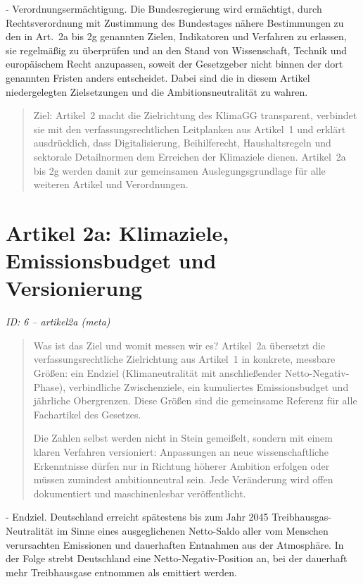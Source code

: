 \documentclass[12pt,a4paper]{scrartcl}
\begin{document}
- Verordnungsermächtigung. Die Bundesregierung wird ermächtigt, durch Rechtsverordnung mit Zustimmung des Bundestages nähere Bestimmungen zu den in Art. 2a bis 2g genannten Zielen, Indikatoren und Verfahren zu erlassen, sie regelmäßig zu überprüfen und an den Stand von Wissenschaft, Technik und europäischem Recht anzupassen, soweit der Gesetzgeber nicht binnen der dort genannten Fristen anders entscheidet. Dabei sind die in diesem Artikel niedergelegten Zielsetzungen und die Ambitionsneutralität zu wahren.

{\footnotesize\begin{quote}
Ziel: Artikel 2 macht die Zielrichtung des KlimaGG transparent, verbindet sie mit den verfassungsrechtlichen Leitplanken aus Artikel 1 und erklärt ausdrücklich, dass Digitalisierung, Beihilferecht, Haushaltsregeln und sektorale Detailnormen dem Erreichen der Klimaziele dienen. Artikel 2a bis 2g werden damit zur gemeinsamen Auslegungsgrundlage für alle weiteren Artikel und Verordnungen.
\end{quote}}



\section[Artikel 2a: Klimaziele, Emissionsbudget und Versionierung]{Artikel 2a: Klimaziele, Emissionsbudget und Versionierung}
\noindent\textit{ID: 6 -- artikel2a (meta)}

\begin{quote}
Was ist das Ziel und womit messen wir es? Artikel 2a übersetzt die verfassungsrechtliche Zielrichtung aus Artikel 1 in konkrete, messbare Größen: ein Endziel (Klimaneutralität mit anschließender Netto-Negativ-Phase), verbindliche Zwischenziele, ein kumuliertes Emissionsbudget und jährliche Obergrenzen. Diese Größen sind die gemeinsame Referenz für alle Fachartikel des Gesetzes.

Die Zahlen selbst werden nicht in Stein gemeißelt, sondern mit einem klaren Verfahren versioniert: Anpassungen an neue wissenschaftliche Erkenntnisse dürfen nur in Richtung höherer Ambition erfolgen oder müssen zumindest ambitionneutral sein. Jede Veränderung wird offen dokumentiert und maschinenlesbar veröffentlicht.
\end{quote}

- Endziel. Deutschland erreicht spätestens bis zum Jahr 2045 Treibhausgas-Neutralität im Sinne eines ausgeglichenen Netto-Saldo aller vom Menschen verursachten Emissionen und dauerhaften Entnahmen aus der Atmosphäre. In der Folge strebt Deutschland eine Netto-Negativ-Position an, bei der dauerhaft mehr Treibhausgase entnommen als emittiert werden.
\end{document}

